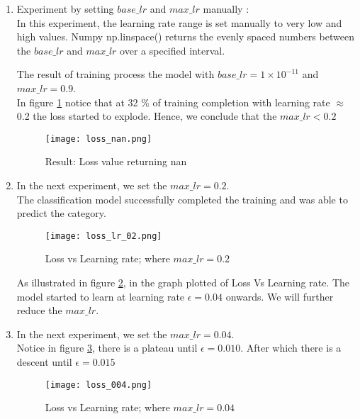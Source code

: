 \begin{enumerate}
    \item Experiment by setting $base\_lr$ and $max\_lr$  manually : \\
    In this experiment, the learning rate range is set manually to very low and high values. Numpy np.linspace() \parencite{harris2020array} returns the evenly spaced numbers between the  $base\_lr$ and $max\_lr$ over a specified interval.

    The result of training process the model with $base\_lr =1 \times 10^{-11}$ and $max\_lr=0.9$.\\
    In figure \ref{fig:Loss value} notice that at 32 \% of training completion with learning rate $\approx$ 0.2 the loss started to explode. Hence, we conclude that the  $max\_lr < 0.2$

    \begin{figure}
        \centering    
        \texttt{[image: loss\_nan.png]}
        \caption{Result: Loss value returning nan}
        \label{fig:Loss value}
    \end{figure}


    \item In the next experiment, we set the $max\_lr = 0.2$. \\
    The classification model successfully completed the training and was able to predict the category.
    \begin{figure}
        \centering    
        \texttt{[image: loss\_lr\_02.png]}
        \caption{Loss vs Learning rate; where $max\_lr = 0.2$}
        \label{fig:Loss value at 0.2}
    \end{figure}
    
    As illustrated in figure \ref{fig:Loss value at 0.2}, in the graph plotted of Loss Vs Learning rate. The model started to learn at learning rate $\epsilon = 0.04$ onwards. We will further reduce the $max\_lr$.

    \item In the next experiment, we set the $max\_lr = 0.04$. \\
    Notice in figure \ref{fig:Loss value at 0.04}, there is a plateau until $\epsilon = 0.010$. After which there is a descent until $\epsilon = 0.015$
    \begin{figure}
        \centering    
        \texttt{[image: loss\_004.png]}
        \caption{Loss vs Learning rate; where $max\_lr = 0.04$}
        \label{fig:Loss value at 0.04}
    \end{figure}


\end{enumerate}
